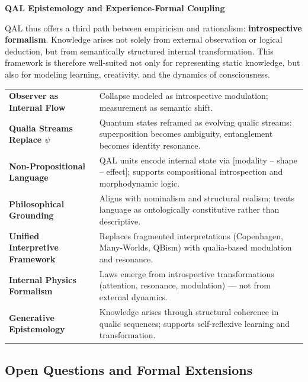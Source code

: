 \documentclass[11pt]{article}
\numberwithin{equation}{section} %
\begin{document}
\bigskip

\noindent\textbf{QAL Epistemology and Experience-Formal Coupling}

QAL thus offers a third path between empiricism and rationalism: \textbf{introspective formalism}. Knowledge arises not solely from external observation or logical deduction, but from semantically structured internal transformation. This framework is therefore well-suited not only for representing static knowledge, but also for modeling learning, creativity, and the dynamics of consciousness.

\begin{tcolorbox}[
  colback=blue!5!white,
  colframe=blue!50!black,
  title=Summary of QAL Contributions,
  fonttitle=\bfseries,
  arc=3mm,
  boxrule=0.5pt,
  width=\textwidth,
  enhanced,
  sharp corners=south,
]
\begin{tabularx}{\textwidth}{>{\bfseries}p{4cm}X}
Observer as Internal Flow & Collapse modeled as introspective modulation; measurement as semantic shift. \\[0.5em]
Qualia Streams Replace \texttt{$\psi$} & Quantum states reframed as evolving qualic streams: superposition becomes ambiguity, entanglement becomes identity resonance. \\[0.5em]
Non-Propositional Language & QAL units encode internal state via [modality – shape – effect]; supports compositional introspection and morphodynamic logic. \\[0.5em]
Philosophical Grounding & Aligns with nominalism and structural realism; treats language as ontologically constitutive rather than descriptive. \\[0.5em]
Unified Interpretive Framework & Replaces fragmented interpretations (Copenhagen, Many-Worlds, QBism) with qualia-based modulation and resonance. \\[0.5em]
Internal Physics Formalism & Laws emerge from introspective transformations (attention, resonance, modulation) — not from external dynamics. \\[0.5em]
Generative Epistemology & Knowledge arises through structural coherence in qualic sequences; supports self-reflexive learning and transformation. \\
\end{tabularx}
\end{tcolorbox}

\subsection{Open Questions and Formal Extensions}
\end{document}
